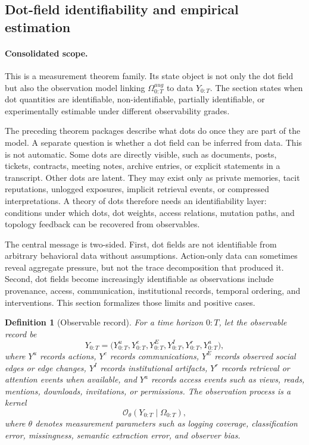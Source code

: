 \documentclass[11pt]{article}
\newtheorem{definition}{Definition}
\theoremstyle{remark}
\begin{document}
\subsection{Dot-field identifiability and empirical estimation}\label{dot-field-identifiability-and-empirical-estimation}

\paragraph{Consolidated scope.} This is a measurement theorem family. Its state object is not only the dot field but also the observation model linking $\Omega_{0:T}^{aug}$ to data $Y_{0:T}$. The section states when dot quantities are identifiable, non-identifiable, partially identifiable, or experimentally estimable under different observability grades.

The preceding theorem packages describe what dots do once they are part
of the model. A separate question is whether a dot field can be inferred
from data. This is not automatic. Some dots are directly visible, such
as documents, posts, tickets, contracts, meeting notes, archive entries,
or explicit statements in a transcript. Other dots are latent. They may
exist only as private memories, tacit reputations, unlogged exposures,
implicit retrieval events, or compressed interpretations. A theory of
dots therefore needs an identifiability layer: conditions under which
dots, dot weights, access relations, mutation paths, and topology
feedback can be recovered from observables.

The central message is two-sided. First, dot fields are
not identifiable from arbitrary behavioral data without assumptions.
Action-only data can sometimes reveal aggregate pressure, but not the
trace decomposition that produced it. Second, dot fields become
increasingly identifiable as observations include provenance, access,
communication, institutional records, temporal ordering, and
interventions. This section formalizes those limits and positive cases.

\begin{definition}[Observable record]\label{def:observable-record}
For a time horizon $0:T$, let the observable record be
$$
Y_{0:T}=\big(Y^u_{0:T},Y^c_{0:T},Y^E_{0:T},Y^I_{0:T},Y^r_{0:T},Y^a_{0:T}\big),
$$
where $Y^u$ records actions, $Y^c$ records communications, $Y^E$ records
observed social edges or edge changes, $Y^I$ records institutional
artifacts, $Y^r$ records retrieval or attention events when available,
and $Y^a$ records access events such as views, reads, mentions,
downloads, invitations, or permissions. The observation process is a
kernel
$$
\mathcal O_\theta(Y_{0:T}\mid \Omega_{0:T}),
$$
where $\theta$ denotes measurement parameters such as logging coverage,
classification error, missingness, semantic extraction error, and
observer bias.
\end{definition}
\end{document}
